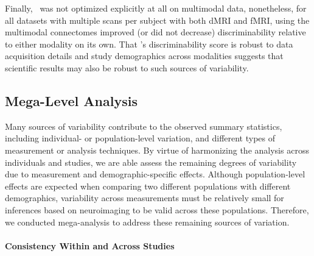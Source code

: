 \documentclass[11pt]{article}
\begin{document}
\begin{multicols}{2}
Finally, \ndmg~was not optimized explicitly at all on multimodal data, nonetheless, for all datasets with multiple scans per subject with both dMRI and fMRI, using the multimodal connectomes improved (or did not decrease) discriminability relative to either modality on its own.
That \ndmg's discriminability score is robust to data acquisition details and study demographics across modalities suggests that scientific results may also be robust to such sources of variability.

 
%
%
%

\subsection{Mega-Level Analysis}

Many sources of variability contribute to the observed summary statistics, including individual- or population-level variation,  and different types of measurement or analysis techniques. By virtue of harmonizing the analysis across individuals and studies, we are able assess the remaining degrees of variability due to measurement and demographic-specific effects. Although population-level effects are expected when comparing two different populations with different demographics, variability across measurements must be relatively small for inferences based on neuroimaging to be valid across these populations. Therefore, we conducted mega-analysis to address these remaining sources of variation.  


\paragraph{Consistency Within and Across Studies}


\end{multicols}
\end{document}
